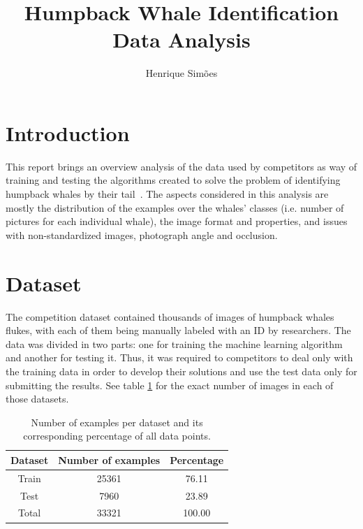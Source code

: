 \documentclass[12pt,
    brazil,			%
	english,        %
	]{article}
\title{Humpback Whale Identification\\Data Analysis}
\author{Henrique Simões}
\begin{document}
\maketitle

\section{Introduction}

This report brings an overview analysis of the data used by competitors as way of training and testing the algorithms created to solve the problem of identifying humpback whales by their tail~\cite{kaggle2019humpback}. The aspects considered in this analysis are mostly the distribution of the examples over the whales' classes (i.e. number of pictures for each individual whale), the image format and properties, and issues with non-standardized images, photograph angle and occlusion.

\section{Dataset}

The competition dataset contained thousands of images of humpback whales flukes, with each of them being manually labeled with an ID by researchers. The data was divided in two parts: one for training the machine learning algorithm and another for testing it. Thus, it was required to competitors to deal only with the training data in order to develop their solutions and use the test data only for submitting the results. See table \ref{tab:number-examples} for the exact number of images in each of those datasets.

\begin{table}[hbt]
    \centering
    \setlength{\tabcolsep}{25pt} %
    \renewcommand{\arraystretch}{1.5} %
    \begin{tabular}{ccc}
        \hline \hline
        Dataset     & Number of examples    & Percentage \\ \hline
        Train       & 25361                 & 76.11 \\
        Test        & 7960                  & 23.89 \\ \hline
        Total       & 33321                 & 100.00 \\
        \hline \hline
    \end{tabular}
    \caption{Number of examples per dataset and its corresponding percentage of all data points.}
    \label{tab:number-examples}
\end{table}
\end{document}
